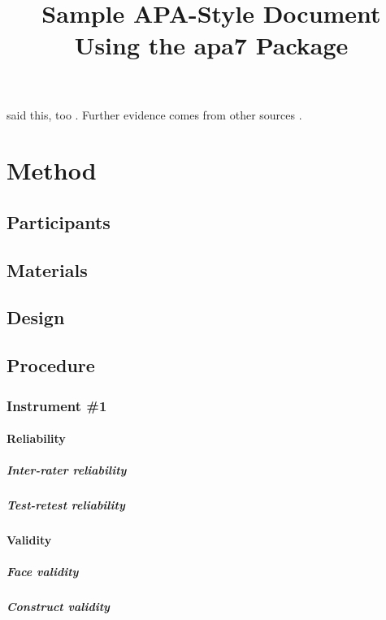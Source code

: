 \documentclass[
    a4paper,
    stu,
    12pt,
   noextraspace,
   floatsintext,
   draftall
]{APA7}
\title{Sample APA-Style Document Using the \textsf{apa7} Package}
\begin{document}
\maketitle
\lipsum[2]

\Textcite{vonDavier2011} said this,
too \parencite{vonDavier2011,Lassen2006}.  Further evidence comes from
other sources \parencite{Shotton1989,Lassen2006}.  \lipsum[3]

\section{Method}
\subsection{Participants}
\lipsum[4]

\subsection{Materials}
\lipsum[5]

\subsection{Design}
\lipsum[6]

\subsection{Procedure}
\lipsum[7]

\subsubsection{Instrument \#1}
\lipsum[8]

\paragraph{Reliability}
\lipsum[9]

\subparagraph{Inter-rater reliability}
\lipsum[10]

\subparagraph{Test-retest reliability}
\lipsum[11]

\paragraph{Validity}
\lipsum[12]

\subparagraph{Face validity}
\lipsum[13]

\subparagraph{Construct validity}
\lipsum[14]
\end{document}
